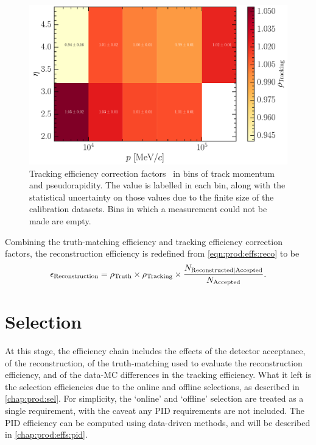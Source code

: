 \begin{figure}
  \centering
  \includegraphics[width=\textwidth]{figures/production/efficiencies/tracking_correction_table}
  \caption{%
    Tracking efficiency correction factors \efftracking\ in bins of track 
    momentum and pseudorapidity.
    The value is labelled in each bin, along with the statistical uncertainty 
    on those values due to the finite size of the calibration datasets.
    Bins in which a measurement could not be made are empty.
  }
  \label{fig:prod:effs:tracking_table}
\end{figure}

Combining the truth-matching efficiency and tracking efficiency correction 
factors, the reconstruction efficiency is redefined from 
\cref{eqn:prod:effs:reco} to be
\begin{equation}
  \effreco = \efftruth\times\efftracking\times\frac{%
    N_{\text{Reconstructed}|\text{Accepted}}
  }
  {%
    N_{\text{\text{Accepted}}}
  }.
  \label{eqn:prod:effs:reco_corrected}
\end{equation}

\section{Selection}
\label{chap:prod:effs:sel}

At this stage, the efficiency chain includes the effects of the detector 
acceptance, of the reconstruction, of the truth-matching used to evaluate the 
reconstruction efficiency, and of the data-\ac{MC} differences in the tracking 
efficiency.
What it left is the selection efficiencies due to the online and offline 
selections, as described in \cref{chap:prod:sel}.
For simplicity, the `online' and `offline' selection are treated as a single 
requirement, with the caveat any \ac{PID} requirements are not included.
The \ac{PID} efficiency can be computed using data-driven methods, and will be 
described in \cref{chap:prod:effs:pid}.

